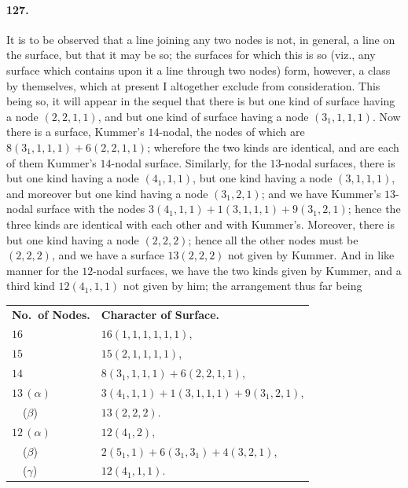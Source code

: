 \documentclass[11pt,a4paper]{article}
\begin{document}
\paragraph{127.}
It is to be observed that a line joining any two nodes is not, in general,
a line on the surface, but that it may be so; the surfaces for which this
is so (viz., any surface which contains upon it a line through two nodes)
form, however, a class by themselves, which at present I altogether
exclude from consideration. This being so, it will appear in the sequel
that there is but one kind of surface having a node $(2, 2, 1, 1)$, and
but one kind of surface having a node $(3_1, 1, 1, 1)$. Now there is a
surface, Kummer's $14$-nodal, the nodes of which are
$8(3_1, 1, 1, 1) + 6(2, 2, 1, 1)$; wherefore the two kinds are identical,
and are each of them Kummer's $14$-nodal surface. Similarly, for the
$13$-nodal surfaces, there is but one kind having a node $(4_1, 1, 1)$,
but one kind having a node $(3, 1, 1, 1)$, and moreover but one kind
having a node $(3_1, 2, 1)$; and we have Kummer's $13$-nodal surface with
the nodes $3(4_1, 1, 1) + 1(3, 1, 1, 1) + 9(3_1, 2, 1)$; hence the three
kinds are identical with each other and with Kummer's. Moreover, there is
but one kind having a node $(2, 2, 2)$; hence all the other nodes must be
$(2, 2, 2)$, and we have a surface $13(2, 2, 2)$ not given by Kummer. And
in like manner for the $12$-nodal surfaces, we have the two kinds given
by Kummer, and a third kind $12(4_1, 1, 1)$ not given by him; the
arrangement thus far being

\medskip

\begin{center}
\begin{tabular}{ll}
\textbf{No.\ of Nodes.} & \textbf{Character of Surface.} \\
$16$              & $16(1, 1, 1, 1, 1, 1)$, \\
$15$              & $15(2, 1, 1, 1, 1)$, \\
$14$              & $8(3_1, 1, 1, 1) + 6(2, 2, 1, 1)$, \\
$13\,(\alpha)$    & $3(4_1, 1, 1) + 1(3, 1, 1, 1) + 9(3_1, 2, 1)$, \\
\ \ ($\beta$)     & $13(2, 2, 2)$. \\
$12\,(\alpha)$    & $12(4_1, 2)$, \\
\ \ ($\beta$)     & $2(5_1, 1) + 6(3_1, 3_1) + 4(3, 2, 1)$, \\
\ \ ($\gamma$)    & $12(4_1, 1, 1)$.
\end{tabular}
\end{center}
\end{document}
